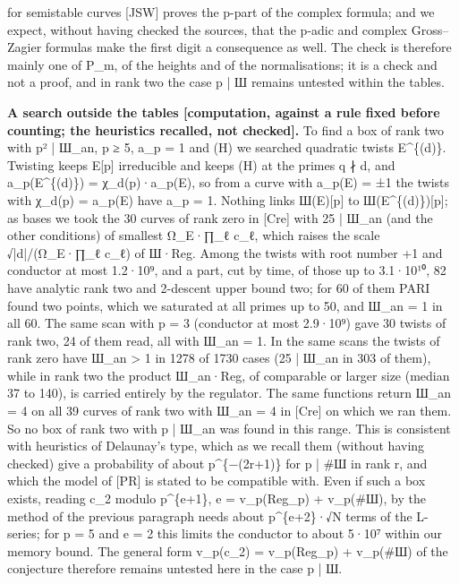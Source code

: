 \documentclass[11pt,a4paper]{article}
\theoremstyle{named}
\begin{document}
for semistable curves [JSW] proves the p-part of the complex formula; and we expect, without having checked the sources, that the p-adic and complex Gross–Zagier formulas make the first digit a consequence as well. The check is therefore mainly one of P\_m, of the heights and of the normalisations; it is a check and not a proof, and in rank two the case p | Ш remains untested within the tables.

\textbf{A search outside the tables [computation, against a rule fixed before counting; the heuristics recalled, not checked].} To find a box of rank two with p² | Ш\_an, p ≥ 5, a\_p = 1 and (H) we searched quadratic twists E\textasciicircum{}\{(d)\}. Twisting keeps E[p] irreducible and keeps (H) at the primes q ∤ d, and a\_p(E\textasciicircum{}\{(d)\}) = χ\_d(p)·a\_p(E), so from a curve with a\_p(E) = ±1 the twists with χ\_d(p) = a\_p(E) have a\_p = 1. Nothing links Ш(E)[p] to Ш(E\textasciicircum{}\{(d)\})[p]; as bases we took the 30 curves of rank zero in [Cre] with 25 | Ш\_an (and the other conditions) of smallest Ω\_E·∏\_ℓ c\_ℓ, which raises the scale √|d|/(Ω\_E·∏\_ℓ c\_ℓ) of Ш·Reg. Among the twists with root number +1 and conductor at most 1.2·10⁹, and a part, cut by time, of those up to 3.1·10¹⁰, 82 have analytic rank two and 2-descent upper bound two; for 60 of them PARI found two points, which we saturated at all primes up to 50, and Ш\_an = 1 in all 60. The same scan with p = 3 (conductor at most 2.9·10⁹) gave 30 twists of rank two, 24 of them read, all with Ш\_an = 1. In the same scans the twists of rank zero have Ш\_an \textgreater{} 1 in 1278 of 1730 cases (25 | Ш\_an in 303 of them), while in rank two the product Ш\_an·Reg, of comparable or larger size (median 37 to 140), is carried entirely by the regulator. The same functions return Ш\_an = 4 on all 39 curves of rank two with Ш\_an = 4 in [Cre] on which we ran them. So no box of rank two with p | Ш\_an was found in this range. This is consistent with heuristics of Delaunay's type, which as we recall them (without having checked) give a probability of about p\textasciicircum{}\{−(2r+1)\} for p | \#Ш in rank r, and which the model of [PR] is stated to be compatible with. Even if such a box exists, reading c\_2 modulo p\textasciicircum{}\{e+1\}, e = v\_p(Reg\_p) + v\_p(\#Ш), by the method of the previous paragraph needs about p\textasciicircum{}\{e+2\}·√N terms of the L-series; for p = 5 and e = 2 this limits the conductor to about 5·10⁷ within our memory bound. The general form v\_p(c\_2) = v\_p(Reg\_p) + v\_p(\#Ш) of the conjecture therefore remains untested here in the case p | Ш.
\end{document}
